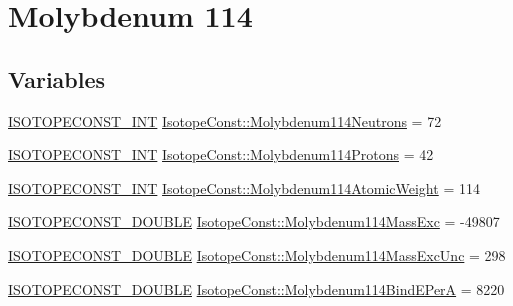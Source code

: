 \hypertarget{group___isotope_const-_molybdenum-_mo114}{}\section{Molybdenum 114}
\label{group___isotope_const-_molybdenum-_mo114}
\subsection*{Variables}
\begin{DoxyCompactItemize}
\item 
\mbox{\hyperlink{group___isotope_const-_macros_ga5f18360b3e99483a35c32d789e62621c}{I\+S\+O\+T\+O\+P\+E\+C\+O\+N\+S\+T\+\_\+\+I\+NT}} \mbox{\hyperlink{group___isotope_const-_molybdenum-_mo114_gac0ae9a71e323ab003b7cdf91747629be}{Isotope\+Const\+::\+Molybdenum114\+Neutrons}} = 72
\item 
\mbox{\hyperlink{group___isotope_const-_macros_ga5f18360b3e99483a35c32d789e62621c}{I\+S\+O\+T\+O\+P\+E\+C\+O\+N\+S\+T\+\_\+\+I\+NT}} \mbox{\hyperlink{group___isotope_const-_molybdenum-_mo114_gad852aecb0f7e2493b8fb67f5a88fec74}{Isotope\+Const\+::\+Molybdenum114\+Protons}} = 42
\item 
\mbox{\hyperlink{group___isotope_const-_macros_ga5f18360b3e99483a35c32d789e62621c}{I\+S\+O\+T\+O\+P\+E\+C\+O\+N\+S\+T\+\_\+\+I\+NT}} \mbox{\hyperlink{group___isotope_const-_molybdenum-_mo114_gabcc57a5d9f626824a0ab600ee02e596f}{Isotope\+Const\+::\+Molybdenum114\+Atomic\+Weight}} = 114
\item 
\mbox{\hyperlink{group___isotope_const-_macros_ga8f45a7272ce02c0b4c65c44636ed719a}{I\+S\+O\+T\+O\+P\+E\+C\+O\+N\+S\+T\+\_\+\+D\+O\+U\+B\+LE}} \mbox{\hyperlink{group___isotope_const-_molybdenum-_mo114_gadda4fe122ea67d3e6a1336b364f6b6dd}{Isotope\+Const\+::\+Molybdenum114\+Mass\+Exc}} = -\/49807
\item 
\mbox{\hyperlink{group___isotope_const-_macros_ga8f45a7272ce02c0b4c65c44636ed719a}{I\+S\+O\+T\+O\+P\+E\+C\+O\+N\+S\+T\+\_\+\+D\+O\+U\+B\+LE}} \mbox{\hyperlink{group___isotope_const-_molybdenum-_mo114_gae9f887dff710fb4e8ec388ee8dd532e7}{Isotope\+Const\+::\+Molybdenum114\+Mass\+Exc\+Unc}} = 298
\item 
\mbox{\hyperlink{group___isotope_const-_macros_ga8f45a7272ce02c0b4c65c44636ed719a}{I\+S\+O\+T\+O\+P\+E\+C\+O\+N\+S\+T\+\_\+\+D\+O\+U\+B\+LE}} \mbox{\hyperlink{group___isotope_const-_molybdenum-_mo114_ga8a51701218b7c74086916304d0e8163a}{Isotope\+Const\+::\+Molybdenum114\+Bind\+E\+PerA}} = 8220
\item 

\end{DoxyCompactItemize}
